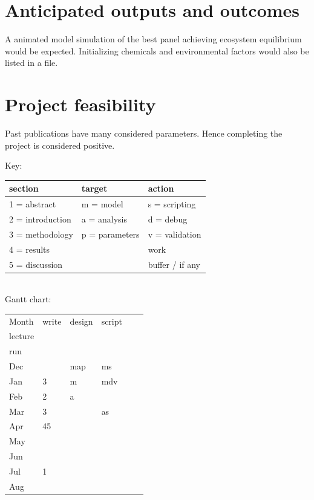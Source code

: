 \documentclass[a4paper, 11pt]{article}
\begin{document}
\section{Anticipated outputs and outcomes}
A animated model simulation of the best panel achieving ecosystem equilibrium would be expected.  Initializing chemicals and environmental factors would also be listed in a file.

\section{Project feasibility}
Past publications have many considered parameters.  Hence completing the project is considered positive.

Key:
\begin{tabular}{lll}
	section & target & action\\\hline
	1 = abstract & m = model & s = scripting\\
	2 = introduction & a = analysis & d = debug\\
	3 = methodology & p = parameters & v = validation\\
	4 = results && \cellcolor{grey90}work\\
	5 = discussion && \cellcolor{lorange}buffer / if any\\
\end{tabular}\\
Gantt chart:
\begin{longtable}{p{.1\linewidth}|p{.1\linewidth}|p{.1\linewidth}|p{.1\linewidth}|p{.1\linewidth}|p{.1\linewidth}|}
	Month	&write					&design					&script					& \begin{tabular}{c}MSc\\lecture\end{tabular}	& \begin{tabular}{c}model\\run\end{tabular}\\\hline
	Dec		&						&\cellcolor{grey90}map	&\cellcolor{grey90}ms	&\cellcolor{lorange}							&										\\
	Jan		&\cellcolor{grey90}3	&\cellcolor{grey90}m	&\cellcolor{grey90}mdv	&\cellcolor{lorange} 							&\cellcolor{grey90}						\\
	Feb		&\cellcolor{grey90}2	&\cellcolor{grey90}a	&						&\cellcolor{lorange} 							&\cellcolor{grey90}						\\
	Mar		&\cellcolor{lorange}3	&\cellcolor{lorange}	&\cellcolor{grey90}as	&\cellcolor{lorange} 							&\cellcolor{grey90}						\\
	Apr		&\cellcolor{grey90}45	&						&\cellcolor{grey90}		&												&\cellcolor{grey90}						\\
	May		&\cellcolor{grey90}		&						&\cellcolor{grey90}		&												&\cellcolor{grey90}						\\
	Jun		&\cellcolor{grey90}		&						&\cellcolor{lorange}	&												&\cellcolor{lorange}					\\
	Jul		&\cellcolor{grey90}1	&						&						&												&\cellcolor{lorange}					\\
	Aug		&\cellcolor{lorange}	&						&\cellcolor{lorange}	&												&\cellcolor{lorange}					\\
\end{longtable}
\end{document}
